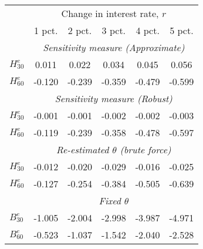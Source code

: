 \begin{tabular}{l*{5}{c}} \toprule 
& \multicolumn{5}{c}{ Change in interest rate, $r$ } \\ \cmidrule(lr){2-6}  
& 1 pct. & 2 pct. & 3 pct. & 4 pct. & 5 pct. \\ \midrule 
& \multicolumn{5}{c}{ \emph{Sensitivity measure (Approximate)} } \\ \cmidrule(lr){2-6}  
 $H^e_{30}$  & 0.011  & 0.022  & 0.034  & 0.045  & 0.056 
 \\ $H^e_{60}$  & -0.120  & -0.239  & -0.359  & -0.479  & -0.599 \\ \cmidrule(lr){2-6}  
& \multicolumn{5}{c}{ \emph{Sensitivity measure (Robust)} } \\ \cmidrule(lr){2-6}  
 $H^e_{30}$  & -0.001  & -0.001  & -0.002  & -0.002  & -0.003 
 \\ $H^e_{60}$  & -0.119  & -0.239  & -0.358  & -0.478  & -0.597 \\ \cmidrule(lr){2-6}  
& \multicolumn{5}{c}{ \emph{Re-estimated $\theta$ (brute force)} } \\ \cmidrule(lr){2-6}
 $H^e_{30}$  & -0.012  & -0.020  & -0.029  & -0.016  & -0.025 \\ 
 $H^e_{60}$  & -0.127  & -0.254  & -0.384  & -0.505  & -0.639 \\ \cmidrule(lr){2-6}  
& \multicolumn{5}{c}{ \emph{Fixed $\theta$ }} \\ \cmidrule(lr){2-6}
 $B^e_{30}$  & -1.005  & -2.004  & -2.998  & -3.987  & -4.971 \\ 
 $B^e_{60}$  & -0.523  & -1.037  & -1.542  & -2.040  & -2.528 \\ 
 \bottomrule  \end{tabular} 

